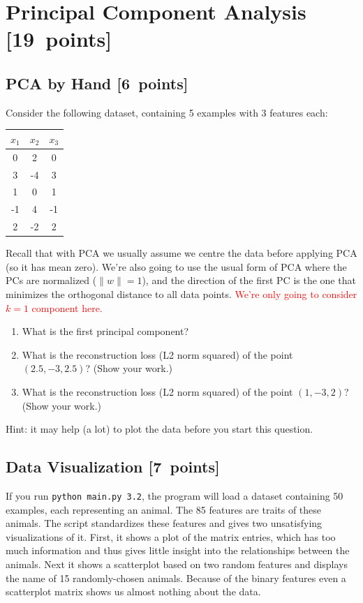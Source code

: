 \documentclass{article}
\newcommand{\blu}[1]{{\textcolor{blu}{#1}}}
\newcommand{\red}[1]{\textcolor{red}{#1}}
\let\ask\blu
\let\update\red
\newcommand\pts[1]{\textcolor{pointscolour}{[#1~points]}}
\newcommand{\norm}[1]{\lVert #1 \rVert}
\begin{document}
\clearpage
\section{Principal Component Analysis \pts{19}}
\subsection{PCA by Hand \pts{6}}

Consider the following dataset, containing 5 examples with 3 features each:
\begin{center}
  \begin{tabular}{ccc}
    $x_1$ & $x_2$ & $x_3$ \\
    \hline
     0 &  2 &  0 \\
     3 & -4 &  3 \\
     1 &  0 &  1 \\
    -1 &  4 & -1 \\
     2 & -2 &  2 \\
  \end{tabular}
\end{center}
Recall that with PCA we usually assume we centre the data before applying PCA (so it has mean zero).
We're also going to use the usual form of PCA where the PCs are normalized ($\norm{w} = 1$),
and the direction of the first PC is the one that minimizes the orthogonal distance to all data points.
\update{We're only going to consider $k = 1$ component here.}
\begin{enumerate}
  \item \ask{What is the first principal component?}
  \item \ask{What is the reconstruction loss (L2 norm squared) of the point $(2.5, -3, 2.5)$? (Show your work.)}
  \item \ask{What is the reconstruction loss (L2 norm squared) of the point $(1, -3, 2)$? (Show your work.)}
\end{enumerate}
Hint: it may help (a lot) to plot the data before you start this question.



\subsection{Data Visualization \pts{7}}

If you run \verb|python main.py 3.2|, the program will load a dataset containing 50 examples, each representing an animal.
The 85 features are traits of these animals.
The script standardizes these features and gives two unsatisfying visualizations of it.
First, it shows a plot of the matrix entries, which has too much information and thus gives little insight into the relationships between the animals.
Next it shows a scatterplot based on two random features and displays the name of 15 randomly-chosen animals.
Because of the binary features even a scatterplot matrix shows us almost nothing about the data.
\end{document}
